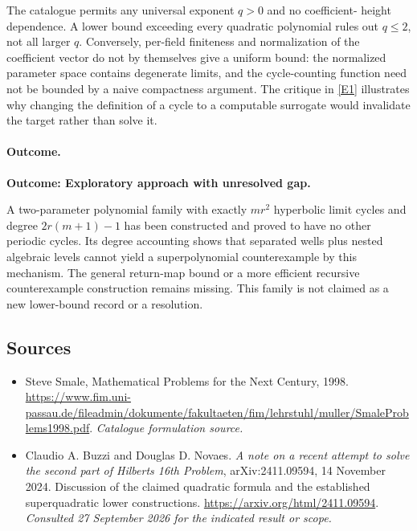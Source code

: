 \documentclass[11pt,a4paper]{article}
\newcommand{\eref}[2]{\hyperlink{extra:#1:#2}{[E#2]}}
\numberwithin{equation}{section}
\begin{document}
The catalogue permits any universal exponent $q>0$ and no coefficient-
height dependence.  A lower bound exceeding every quadratic polynomial
rules out $q\leq2$, not all larger $q$.  Conversely, per-field finiteness
and normalization of the coefficient vector do not by themselves give
a uniform bound: the normalized parameter space contains degenerate
limits, and the cycle-counting function need not be bounded by a
naive compactness argument.  The critique in \eref{125}{1} illustrates
why changing the definition of a cycle to a computable surrogate would
invalidate the target rather than solve it.

\paragraph{Outcome.}
\textbf{Outcome: Exploratory approach with unresolved gap.}

A two-parameter polynomial family with exactly $mr^2$ hyperbolic limit
cycles and degree $2r(m+1)-1$ has been constructed and proved to have
no other periodic cycles.  Its degree accounting shows that separated
wells plus nested algebraic levels cannot yield a superpolynomial
counterexample by this mechanism.  The general return-map bound or a
more efficient recursive counterexample construction remains missing.
This family is not claimed as a new lower-bound record or a resolution.
\subsection{Sources}
\begin{itemize}\raggedright
\item[\textnormal{[S1]}]\hypertarget{source:125:1}{} Steve Smale, Mathematical Problems for the Next Century, 1998.
\url{https://www.fim.uni-passau.de/fileadmin/dokumente/fakultaeten/fim/lehrstuhl/muller/SmaleProblems1998.pdf}.
{\small\textit{Catalogue formulation source.}}
\item[\textnormal{[E1]}]\hypertarget{extra:125:1}{} Claudio A. Buzzi and Douglas D. Novaes.
\emph{A note on a recent attempt to solve the second part of Hilbert\textquotesingle s 16th Problem}, arXiv:2411.09594, 14 November 2024. Discussion of the claimed quadratic formula and the established superquadratic lower constructions.
\url{https://arxiv.org/html/2411.09594}.
{\small\textit{Consulted 27 September 2026 for the indicated result or scope.}}
\end{itemize}
\end{document}
